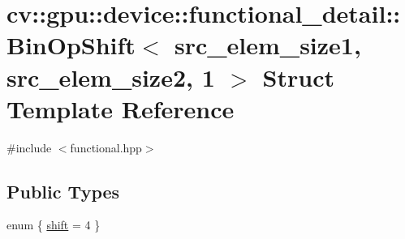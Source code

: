 \hypertarget{structcv_1_1gpu_1_1device_1_1functional__detail_1_1BinOpShift_3_01src__elem__size1_00_01src__elem__size2_00_011_01_4}{\section{cv\-:\-:gpu\-:\-:device\-:\-:functional\-\_\-detail\-:\-:Bin\-Op\-Shift$<$ src\-\_\-elem\-\_\-size1, src\-\_\-elem\-\_\-size2, 1 $>$ Struct Template Reference}
\label{structcv_1_1gpu_1_1device_1_1functional__detail_1_1BinOpShift_3_01src__elem__size1_00_01src__elem__size2_00_011_01_4}
}


{\ttfamily \#include $<$functional.\-hpp$>$}

\subsection*{Public Types}
\begin{DoxyCompactItemize}
\item 
enum \{ \hyperlink{structcv_1_1gpu_1_1device_1_1functional__detail_1_1BinOpShift_3_01src__elem__size1_00_01src__elem__size2_00_011_01_4_ada59c4ce07c8e098fe8fc059339d52bbacc1a73a50aaf72d1ef7cfe6d9c4cd3f5}{shift} = 4
 \}
\end{DoxyCompactItemize}


